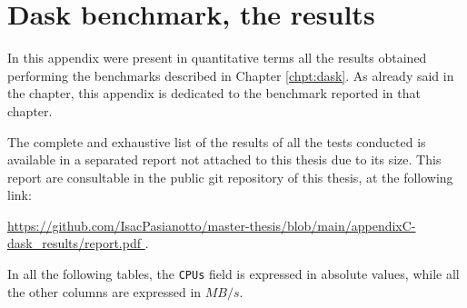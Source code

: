 \chapter{Dask benchmark, the results}\label{appendix:dask}

In this appendix were present in quantitative terms all the results obtained
performing the benchmarks described in Chapter \ref{chpt:dask}.
As already said in the chapter, this appendix is dedicated to the benchmark
reported in that chapter.

The complete and exhaustive list of the results of all the tests conducted is
available in a separated report not attached to this thesis due to its size.
This report are consultable in the public git repository of this thesis, at the
following link:
\begin{center}
  \small
  \url{
    https://github.com/IsacPasianotto/master-thesis/blob/main/appendixC-dask_results/report.pdf
  }.
\end{center}

In all the following tables, the \texttt{CPUs} field is expressed in absolute
values, while all the other columns are expressed in $MB/s$.


